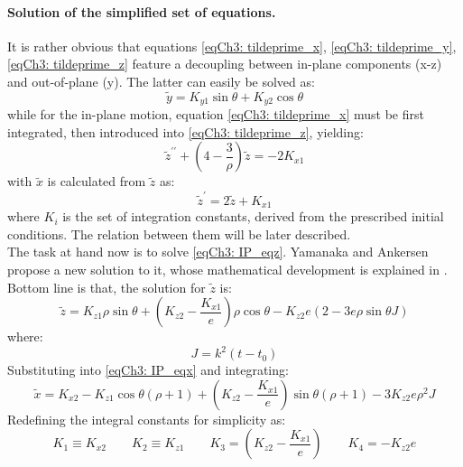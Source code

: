 	\paragraph{Solution of the simplified set of equations. \\}
	\indent It is rather obvious that equations \eqref{eqCh3: tildeprime_x}, \eqref{eqCh3: tildeprime_y}, \eqref{eqCh3: tildeprime_z} feature a decoupling between in-plane components (x-z) and out-of-plane (y). The latter can easily be solved as:
	\begin{equation}
	\widetilde{y} = K_{y1} \sin\theta + K_{y2} \cos\theta
	\label{eqCh3: OOP_sol}
	\end{equation}
	\noindent while for the in-plane motion, equation \eqref{eqCh3: tildeprime_x} must be first integrated, then introduced into \eqref{eqCh3: tildeprime_z}, yielding:
	\begin{equation}
	\widetilde{z}^{\prime\prime} + \left( 4 - \dfrac{3}{\rho} \right) \widetilde{z} = - 2 K_{x1}
	\label{eqCh3: IP_eqz}
	\end{equation} 
	\noindent with $\widetilde{x}$ is calculated from $\widetilde{z}$ as:
	\begin{equation}
	\widetilde{z}^{\prime} = 2 \widetilde{z} + K_{x1}
	\label{eqCh3: IP_eqx}
	\end{equation}
	\noindent where $K_i$ is the set of integration constants, derived from the prescribed initial conditions. The relation between them will be later described.\\
	\indent The task at hand now is to solve \eqref{eqCh3: IP_eqz}. Yamanaka and Ankersen propose a new solution to it, whose mathematical development is explained in  \cite{Yamanaka_Ankersen}. Bottom line is that, the solution for $\widetilde{z}$ is:
	\begin{equation}
	\widetilde{z} = K_{z1} \rho\sin\theta + \left(K_{z2} - \dfrac{K_{x1}}{e}\right) \rho\cos\theta - K_{z2} e\left(2 - 3 e\rho\sin\theta J\right)
	\label{eqCh3: z_tilde}
	\end{equation}
	\noindent where:
	\[
	J = k^2 (t - t_0)
	\]	
	Substituting into \eqref{eqCh3: IP_eqx} and integrating:
	\begin{equation}
	\widetilde{x} = K_{x2} - K_{z1} \cos\theta \left(\rho + 1\right) + \left(K_{z2} - \dfrac{K_{x1}}{e}\right) \sin\theta \left(\rho + 1\right) - 3 K_{z2} e\rho^2 J
	\end{equation}	
	\indent Redefining the integral constants for simplicity as:
	\[
	K_1 \equiv K_{x2} \qquad K_2 \equiv K_{z1} \qquad K_3 = \left(K_{z2} - \dfrac{K_{x1}}{e}\right) \qquad K_{4} = - K_{z2} e
	\]
